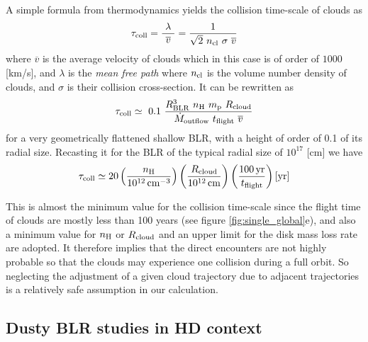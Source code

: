 \documentclass[twocolumn]{aastex62}
\begin{document}
A simple formula from thermodynamics yields the collision time-scale of clouds as
\begin{equation}
\tau_{\rm coll} = \dfrac{~\lambda~}{\overline{v}}
= \dfrac{1}{\sqrt{2}~ n_{\rm cl}~ \sigma~ \overline{v}}
\end{equation}
where $\overline{v}$ is the average velocity of clouds which in this case is of order of $1000$ [km/s], and $\lambda$ is the {\it mean free path} where $n_{\rm cl}$ is the volume number density of clouds, and $\sigma$ is their collision cross-section.
It can be rewritten as
\begin{equation}
\tau_{\rm coll} \simeq ~0.1~
\dfrac{R^3_{\rm BLR}~n_{\rm H}~m_{\rm p}~R_{\rm cloud}}{\dot M_{\rm outflow}~ t_{\rm flight}~ \overline{v}}
\end{equation}
for a very geometrically flattened shallow BLR, with a height of order of 0.1 of its radial size. Recasting it for the BLR of the typical radial size of $10^{17}$ [cm] we have
\begin{equation}
    \tau_{\rm coll} \simeq 20
    \left(\frac{n_{\rm H}}{10^{12}\,{\rm cm^{-3}}} \right)
    \left(\frac{R_{\rm cloud}}{10^{12}\,{\rm cm}} \right)
    \left(\frac{100\,{\rm yr}}{t_{\rm flight}} \right) {\rm [yr]}
\end{equation}

This is almost the minimum value for the collision time-scale since the flight time of clouds are mostly less than 100 years (see figure \ref{fig:single_global}e), and also a minimum value for $n_{\rm H}$ or $R_{\rm cloud}$ and an upper limit for the disk mass loss rate are adopted. It therefore implies that the direct encounters are not highly probable so that the clouds may experience one collision during a full orbit. So neglecting the adjustment of a given cloud trajectory due to adjacent trajectories is a relatively safe assumption in our calculation.

\subsection{Dusty BLR studies in HD context}
\end{document}
